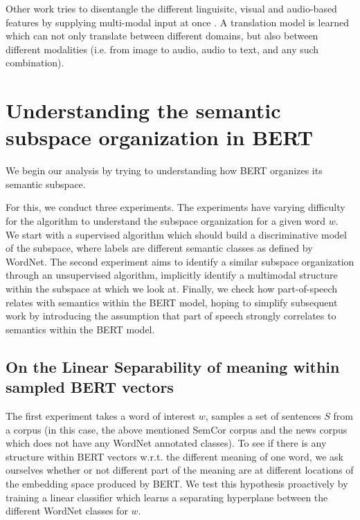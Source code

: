 \documentclass[a4paper,12pt,twoside,openright]{report}
\begin{document}
Other work tries to disentangle the different linguisitc, visual and audio-based features by supplying multi-modal input at once \cite{ma19}.
A translation model is learned which can not only translate between different domains, but also between different modalities (i.e. from image to audio, audio to text, and any such combination).



\chapter{Understanding the semantic subspace organization in BERT}\label{section:Understand_BERT}


We begin our analysis by trying to understanding how BERT organizes its semantic subspace.

For this, we conduct three experiments.
The experiments have varying difficulty for the algorithm to understand the subspace organization for a given word $w$.
We start with a supervised algorithm which should build a discriminative model of the subspace, where labels are different semantic classes as defined by WordNet.
The second experiment aims to identify a similar subspace organization through an unsupervised algorithm, implicitly identify a multimodal structure within the subspace at which we look at.
Finally, we check how part-of-speech relates with semantics within the BERT model, hoping to simplify subsequent work by introducing the assumption that part of speech strongly correlates to semantics within the BERT model.



\section{On the Linear Separability of meaning within sampled BERT vectors}

The first experiment takes a word of interest $w$, samples a set of sentences $S$ from a corpus (in this case, the above mentioned SemCor corpus and the news corpus \cite{news_corpus} which does not have any WordNet annotated classes).
To see if there is any structure within BERT vectors w.r.t. the different meaning of one word, we ask ourselves whether or not different part of the meaning are at different locations of the embedding space produced by BERT.
We test this hypothesis proactively by training a linear classifier which learns a separating hyperplane between the different WordNet classes for $w$.
\end{document}
